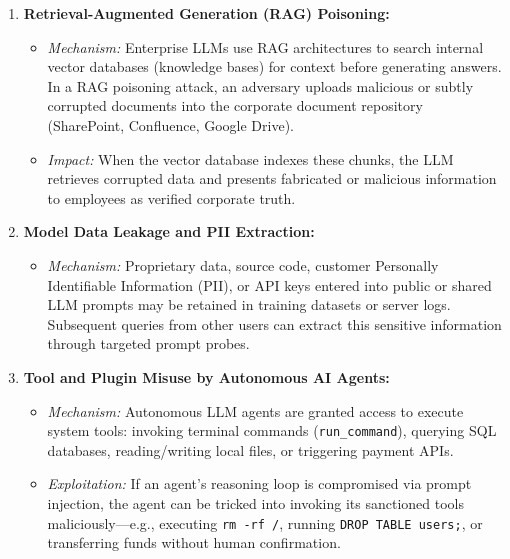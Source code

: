 \begin{enumerate}
\item \textbf{Retrieval-Augmented Generation (RAG) Poisoning:}
\begin{itemize}
\item \textit{Mechanism:} Enterprise LLMs use RAG architectures to search internal vector databases (knowledge bases) for context before generating answers. In a RAG poisoning attack, an adversary uploads malicious or subtly corrupted documents into the corporate document repository (SharePoint, Confluence, Google Drive).
\item \textit{Impact:} When the vector database indexes these chunks, the LLM retrieves corrupted data and presents fabricated or malicious information to employees as verified corporate truth.
\end{itemize}

\item \textbf{Model Data Leakage and PII Extraction:}
\begin{itemize}
\item \textit{Mechanism:} Proprietary data, source code, customer Personally Identifiable Information (PII), or API keys entered into public or shared LLM prompts may be retained in training datasets or server logs. Subsequent queries from other users can extract this sensitive information through targeted prompt probes.
\end{itemize}

\item \textbf{Tool and Plugin Misuse by Autonomous AI Agents:}
\begin{itemize}
\item \textit{Mechanism:} Autonomous LLM agents are granted access to execute system tools: invoking terminal commands (\texttt{run\_command}), querying SQL databases, reading/writing local files, or triggering payment APIs.
\item \textit{Exploitation:} If an agent's reasoning loop is compromised via prompt injection, the agent can be tricked into invoking its sanctioned tools maliciously—e.g., executing \texttt{rm -rf /}, running \texttt{DROP TABLE users;}, or transferring funds without human confirmation.
\end{itemize}
\end{enumerate}

